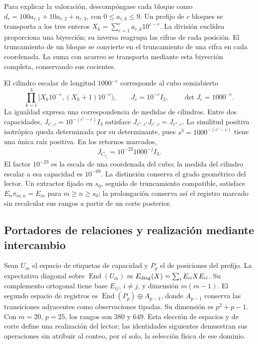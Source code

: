 Para explicar la valoración, descompóngase cada bloque como
$d_r=100a_{r,1}+10a_{r,2}+a_{r,3}$, con $0\leq a_{r,k}\leq9$.
Un prefijo de $c$ bloques se transporta a los tres enteros
$X_k=\sum_{r=1}^c a_{r,k}10^{c-r}$. La división euclídea proporciona
una biyección; su inversa reagrupa las cifras de cada posición. El
truncamiento de un bloque se convierte en el truncamiento de una cifra
en cada coordenada. La suma con acarreo se transporta mediante esta
biyección completa, conservando sus cocientes.

El cilindro escalar de longitud $1000^{-c}$ corresponde al cubo semiabierto
\[
 \prod_{k=1}^3[X_k10^{-c},(X_k+1)10^{-c}),\qquad
 J_c=10^{-c}I_3,\qquad \det J_c=1000^{-c}.
\]
La igualdad expresa una correspondencia de medidas de cilindros. Entre
dos capacidades, $J_{c',c}=10^{-(c'-c)}I_3$ satisface
$J_{c'',c'}J_{c',c}=J_{c'',c}$. La similitud positiva isotrópica queda
determinada por su determinante, pues $s^3=1000^{-(c'-c)}$ tiene una
única raíz positiva. En los retornos marcados,
\begin{equation}
 J_{C_{s_j}}=10^{-23}1000^{-j}I_3.
 \label{eq:ii-ter27-cociclo}
\end{equation}
El factor $10^{-23}$ es la escala de una coordenada del cubo; la medida
del cilindro escalar a esa capacidad es $10^{-69}$. La distinción conserva
el grado geométrico del lector. Un extractor fijado en $s_0$, seguido de
truncamiento compatible, satisface $E_n\pi_{m,n}=E_m$ para $m\geq n\geq
s_0$; la prolongación conserva así el registro marcado sin recalcular sus
rangos a partir de un corte posterior.

\subsection{Portadores de relaciones y realización mediante intercambio}
\label{sec:ii-ter27-portador}

Sean $U_m$ el espacio de etiquetas de capacidad y $P_p$ el de posiciones
del prefijo. La expectativa diagonal sobre $\operatorname{End}(U_m)$ es
$E_{\rm diag}(X)=\sum_iE_{ii}XE_{ii}$. Su complemento ortogonal tiene
base $E_{ij}$, $i\ne j$, y dimensión $m(m-1)$. El segundo espacio de
registros es $\operatorname{End}(P_p)\oplus A_{p-1}$, donde $A_{p-1}$
conserva las transiciones adyacentes como observaciones tipadas. Su
dimensión es $p^2+p-1$. Con $m=20$, $p=25$, los rangos son $380$ y $649$.
Esta elección de espacios y de corte define una realización del lector;
las identidades siguientes demuestran sus operaciones sin atribuir al
conteo, por sí solo, la selección física de ese dominio.

